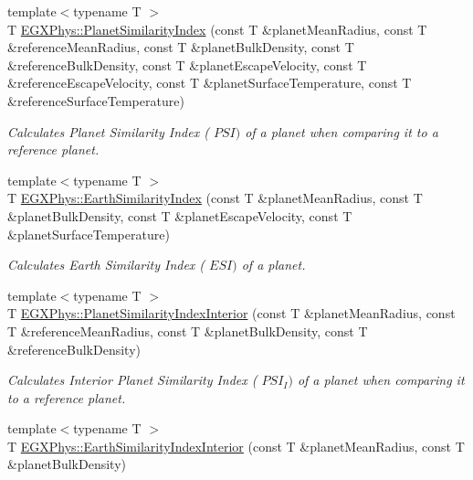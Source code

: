 \begin{DoxyCompactItemize}
\item 
{\footnotesize template$<$typename T $>$ }\\T \hyperlink{group___e_g_x_phys-_planet_similarity_index_ga62e8b781c301df60bd04af3183a965eb}{E\+G\+X\+Phys\+::\+Planet\+Similarity\+Index} (const T \&planet\+Mean\+Radius, const T \&reference\+Mean\+Radius, const T \&planet\+Bulk\+Density, const T \&reference\+Bulk\+Density, const T \&planet\+Escape\+Velocity, const T \&reference\+Escape\+Velocity, const T \&planet\+Surface\+Temperature, const T \&reference\+Surface\+Temperature)
\begin{DoxyCompactList}\small\item\em Calculates Planet Similarity Index ( $PSI)$ of a planet when comparing it to a reference planet. \end{DoxyCompactList}\item 
{\footnotesize template$<$typename T $>$ }\\T \hyperlink{group___e_g_x_phys-_planet_similarity_index_ga4b86397b1c839c49ac599d49fda207d4}{E\+G\+X\+Phys\+::\+Earth\+Similarity\+Index} (const T \&planet\+Mean\+Radius, const T \&planet\+Bulk\+Density, const T \&planet\+Escape\+Velocity, const T \&planet\+Surface\+Temperature)
\begin{DoxyCompactList}\small\item\em Calculates Earth Similarity Index ( $ESI)$ of a planet. \end{DoxyCompactList}\item 
{\footnotesize template$<$typename T $>$ }\\T \hyperlink{group___e_g_x_phys-_planet_similarity_index_ga6dc06a1a8baf6e132abed51fcf410c7f}{E\+G\+X\+Phys\+::\+Planet\+Similarity\+Index\+Interior} (const T \&planet\+Mean\+Radius, const T \&reference\+Mean\+Radius, const T \&planet\+Bulk\+Density, const T \&reference\+Bulk\+Density)
\begin{DoxyCompactList}\small\item\em Calculates Interior Planet Similarity Index ( $PSI_I)$ of a planet when comparing it to a reference planet. \end{DoxyCompactList}\item 
{\footnotesize template$<$typename T $>$ }\\T \hyperlink{group___e_g_x_phys-_planet_similarity_index_ga699bcc2f17b8855eaa856595d8032f61}{E\+G\+X\+Phys\+::\+Earth\+Similarity\+Index\+Interior} (const T \&planet\+Mean\+Radius, const T \&planet\+Bulk\+Density)

\end{DoxyCompactItemize}
